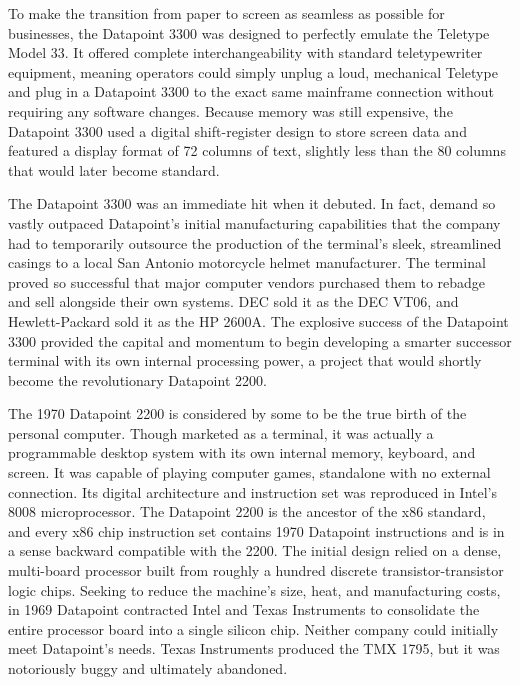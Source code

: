 To make the transition from paper to screen as seamless as possible for businesses, the Datapoint 3300 was designed to perfectly emulate the Teletype Model 33. It offered complete interchangeability with standard teletypewriter equipment, meaning operators could simply unplug a loud, mechanical Teletype and plug in a Datapoint 3300 to the exact same mainframe connection without requiring any software changes. Because memory was still expensive, the Datapoint 3300 used a digital shift-register design to store screen data and featured a display format of 72 columns of text, slightly less than the 80 columns that would later become standard.

The Datapoint 3300 was an immediate hit when it debuted. In fact, demand so vastly outpaced Datapoint's initial manufacturing capabilities that the company had to temporarily outsource the production of the terminal's sleek, streamlined casings to a local San Antonio motorcycle helmet manufacturer. The terminal proved so successful that major computer vendors purchased them to rebadge and sell alongside their own systems. DEC sold it as the DEC VT06, and Hewlett-Packard sold it as the HP 2600A. The explosive success of the Datapoint 3300 provided the capital and momentum to begin developing a smarter successor terminal with its own internal processing power, a project that would shortly become the revolutionary Datapoint 2200.

The 1970 Datapoint 2200 is considered by some to be the true birth of the personal computer. Though marketed as a terminal, it was actually a programmable desktop system with its own internal memory, keyboard, and screen. It was capable of playing computer games, standalone with no external connection. Its digital architecture and instruction set was reproduced in Intel’s 8008 microprocessor. The Datapoint 2200 is the ancestor of the x86 standard, and every x86 chip instruction set contains 1970 Datapoint instructions and is in a sense backward compatible with the 2200. The initial design relied on a dense, multi-board processor built from roughly a hundred discrete transistor-transistor logic chips. Seeking to reduce the machine's size, heat, and manufacturing costs, in 1969 Datapoint contracted Intel and Texas Instruments to consolidate the entire processor board into a single silicon chip. Neither company could initially meet Datapoint's needs. Texas Instruments produced the TMX 1795, but it was notoriously buggy and ultimately abandoned. 

